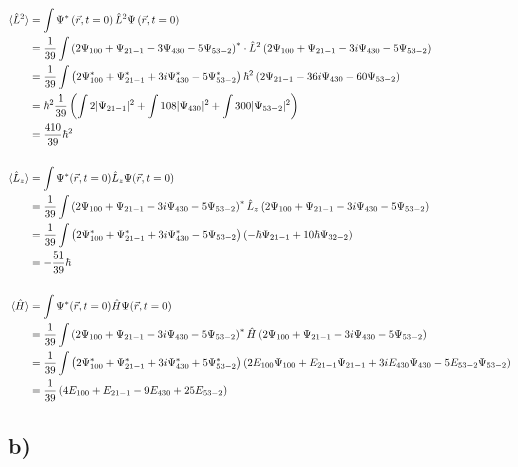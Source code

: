     \begin{align*}
        \langle \hat{L}^2 \rangle &= \int \Psi^*\left( \vec{r},t=0 \right) \hat{L}^2 \Psi\left( \vec{r},t=0 \right)\\
        &= \frac{1}{39} \int \left( 2\Psi_{100} + \Psi_{21-1} - 3\Psi_{430} - 5\Psi_{53-2} \right)^* \cdot \hat{L}^2 \left( 2\Psi_{100} + \Psi_{21-1} - 3i\Psi_{430} - 5\Psi_{53-2} \right)\\
        &= \frac{1}{39} \int \left( 2\Psi_{100}^* + \Psi_{21-1}^* + 3i\Psi_{430}^* - 5\Psi_{53-2}^* \right) \hbar^2 \left( 2\Psi_{21-1} - 36i\Psi_{430} - 60\Psi_{53-2} \right)\\
        &= \hbar^2 \frac{1}{39} \left( \int 2\lvert\Psi_{21-1}\rvert^2 + \int 108\lvert\Psi_{430}\rvert^2 + \int 300\lvert\Psi_{53-2}\rvert^2 \right)\\
        &= \frac{410}{39} \hbar^2\\
        \\
        \langle \hat{L}_z \rangle &= \int \Psi^*(\vec{r},t=0) \hat{L}_z \Psi(\vec{r},t=0)\\
        &= \frac{1}{39} \int \left( 2\Psi_{100} + \Psi_{21-1} - 3i\Psi_{430} - 5\Psi_{53-2} \right)^* \hat{L}_z \left( 2\Psi_{100} + \Psi_{21-1} - 3i\Psi_{430} - 5\Psi_{53-2} \right)\\
        &= \frac{1}{39} \int \left( 2\Psi_{100}^* + \Psi_{21-1}^* + 3i\Psi_{430}^* - 5\Psi_{53-2} \right) \left( -\hbar\Psi_{21-1} + 10\hbar\Psi_{32-2} \right)\\
        &= -\frac{51}{39} \hbar\\
        \\
        \langle \hat{H} \rangle &= \int \Psi^*(\vec{r},t=0) \hat{H} \Psi(\vec{r},t=0)\\
        &= \frac{1}{39} \int \left( 2\Psi_{100} + \Psi_{21-1} - 3i\Psi_{430} - 5\Psi_{53-2} \right)^* \hat{H} \left( 2\Psi_{100} + \Psi_{21-1} - 3i\Psi_{430} - 5\Psi_{53-2} \right)\\
        &= \frac{1}{39} \int \left( 2\Psi_{100}^* + \Psi_{21-1}^* + 3i\Psi_{430}^* + 5\Psi_{53-2}^* \right) \left( 2E_{100}\Psi_{100} + E_{21-1}\Psi_{21-1} + 3iE_{430}\Psi_{430} - 5E_{53-2}\Psi_{53-2} \right)\\
        &= \frac{1}{39} \left( 4E_{100} + E_{21-1} - 9E_{430} + 25E_{53-2} \right)
    \end{align*}

\subsection{b)}


